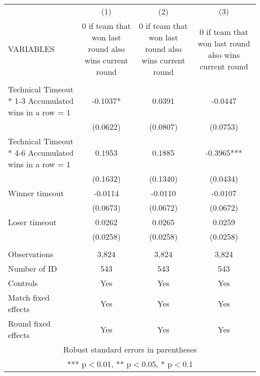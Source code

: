 \documentclass[]{article}
\begin{document}
\begin{tabular}{lccc} \hline
 & (1) & (2) & (3) \\
VARIABLES & 0 if team that won last round also wins current round & 0 if team that won last round also wins current round & 0 if team that won last round also wins current round \\ \hline
 &  &  &  \\
Technical Timeout * 1-3 Accumulated wins in a row = 1 & -0.1037* & 0.0391 & -0.0447 \\
 & (0.0622) & (0.0807) & (0.0753) \\
Technical Timeout * 4-6 Accumulated wins in a row = 1 & 0.1953 & 0.1885 & -0.3965*** \\
 & (0.1632) & (0.1340) & (0.0434) \\
Winner timeout & -0.0114 & -0.0110 & -0.0107 \\
 & (0.0673) & (0.0672) & (0.0672) \\
Loser timeout & 0.0262 & 0.0265 & 0.0259 \\
 & (0.0258) & (0.0258) & (0.0258) \\
 &  &  &  \\
Observations & 3,824 & 3,824 & 3,824 \\
Number of ID & 543 & 543 & 543 \\
Controls & Yes & Yes & Yes \\
Match fixed effects & Yes & Yes & Yes \\
 Round fixed effects & Yes & Yes & Yes \\ \hline
\multicolumn{4}{c}{ Robust standard errors in parentheses} \\
\multicolumn{4}{c}{ *** p$<$0.01, ** p$<$0.05, * p$<$0.1} \\
\end{tabular}
\end{document}
